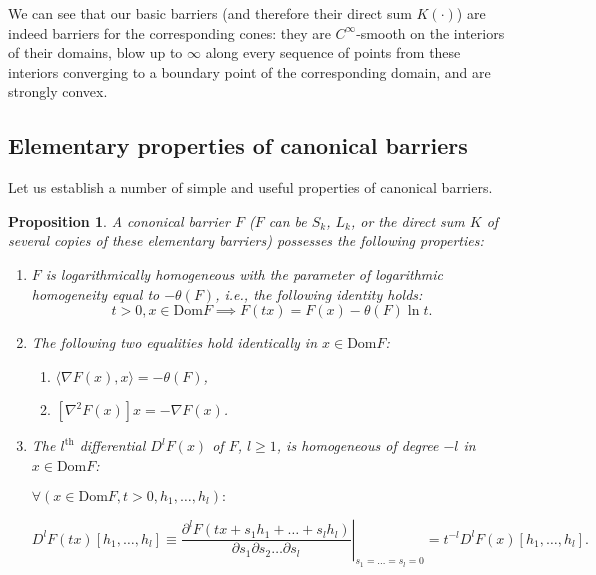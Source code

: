 \documentclass[11pt,a4paper]{article}
\newtheorem{prop}[thm]{Proposition}
\begin{document}
We can see that our basic barriers (and therefore their direct sum $K(\cdot)$) are indeed barriers for the corresponding cones: they are $C^\infty$-smooth on the interiors of their domains, blow up to $\infty$ along every sequence of points from these interiors converging to a boundary point of the corresponding domain, and are strongly convex.

\subsection{Elementary properties of canonical barriers}

Let us establish a number of simple and useful properties of canonical barriers.

\begin{prop}
    A cononical barrier $F$ ($F$ can be $S_k$, $L_k$, or the direct sum $K$ of several copies of these elementary barriers) possesses the following properties:
    \begin{enumerate}
        \item[(i)] $F$ is logarithmically homogeneous with the parameter of logarithmic homogeneity equal to $-\theta(F)$, i.e., the following identity holds:
        \begin{equation*}
            t>0, x \in \text{Dom}F \implies F(tx) = F(x)-\theta(F)\ln t.
        \end{equation*}
        
        \item[(ii)] The following two equalities hold identically in $x \in \text{Dom}F$:
        \begin{enumerate}
            \item[(a)] $\langle\nabla F(x), x\rangle = -\theta(F)$,
            \item[(b)] $[\nabla ^2F(x)]x = -\nabla F(x)$.
        \end{enumerate}
        
        \item[(iii)] The $l^\text{th}$ differential $D^l F(x)$ of $F$, $l\geq 1$, is homogeneous of degree $-l$ in $x \in \text{Dom}F$:

    $\forall(x \in \text{Dom}F, t>0, h_1, \dots, h_l):$
    
    \begin{equation}
        D^l F(tx)[h_1, \dots, h_l] \equiv \left.\frac{\partial^l F(tx+s_1h_1+\dots+s_lh_l)}{\partial s_1\partial s_2 \dots \partial s_l}\right|_{s_1=\dots=s_l=0} = t^{-l}D^lF(x)[h_1,\dots,h_l].
    \end{equation}
    \end{enumerate}
\end{prop}
\end{document}
